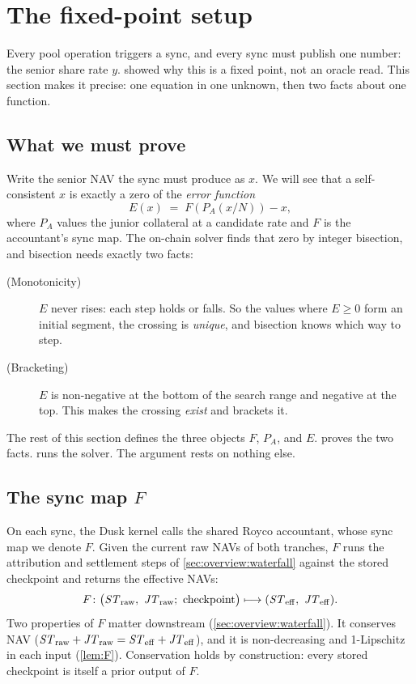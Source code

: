\section{The fixed-point setup}
\label{sec:setup}

Every pool operation triggers a sync, and every sync must publish one
number: the senior share rate $y$. 
showed why this is a fixed point, not an oracle read. This section makes
it precise: one equation in one unknown, then two facts about one
function.

\subsection{What we must prove}
\label{sec:setup:roadmap}

Write the senior NAV the sync must produce as $x$. We will see that a
self-consistent $x$ is exactly a zero of the \emph{error function}
\[
  E(x) \;=\; F\!\left(P_A(x / N)\right) - x,
\]
where $P_A$ values the junior collateral at a candidate rate and $F$ is
the accountant's sync map. The on-chain solver finds that zero by
integer bisection, and bisection needs exactly two facts:

\begin{description}
  \item[(Monotonicity)] $E$ never rises: each step holds or falls. So the
    values where $E \geq 0$ form an initial segment, the crossing is
    \emph{unique}, and bisection knows which way to step.
  \item[(Bracketing)] $E$ is non-negative at the bottom of the search range
    and negative at the top. This makes the crossing \emph{exist} and
    brackets it.
\end{description}

The rest of this section defines the three objects $F$, $P_A$, and $E$.
 proves the two facts.  runs the
solver. The argument rests on nothing else.

\subsection{The sync map $F$}
\label{sec:setup:F}

On each sync, the Dusk kernel calls the shared Royco accountant, whose
sync map we denote $F$. Given the
current raw NAVs of both tranches, $F$ runs the attribution and
settlement steps of \cref{sec:overview:waterfall} against the stored
checkpoint and returns the effective NAVs:
\[
  F\colon \bigl(\STraw,\ \JTraw;\ \text{checkpoint}\bigr) \longmapsto (\STeff,\ \JTeff).
\]
Two properties of $F$ matter downstream (\cref{sec:overview:waterfall}).
It conserves NAV ($\mathit{ST}_{\mathrm{raw}} + \mathit{JT}_{\mathrm{raw}} = \mathit{ST}_{\mathrm{eff}} + \mathit{JT}_{\mathrm{eff}}$), and it is
non-decreasing and 1-Lipschitz in each input (\cref{lem:F}).
Conservation holds by construction: every stored checkpoint is itself a
prior output of $F$.

